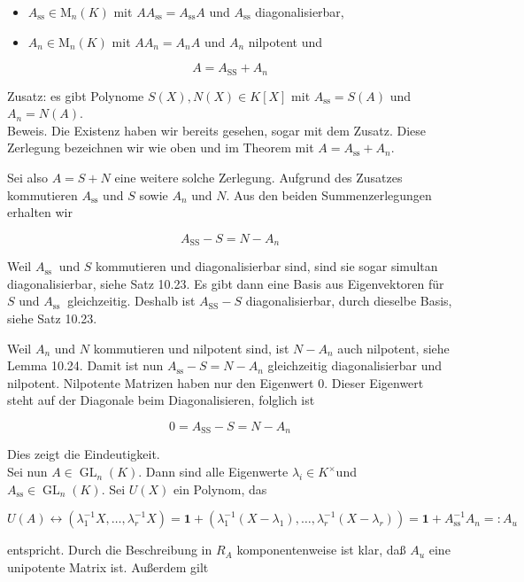 \documentclass[10pt, letterpaper]{article}
\begin{document}
\begin{itemize}
  \item $A_{\mathrm{ss}} \in \mathrm{M}_{n}(K)$ mit $A A_{\mathrm{ss}}=A_{\mathrm{ss}} A$ und $A_{\mathrm{ss}}$ diagonalisierbar,
  \item $A_{n} \in \mathrm{M}_{n}(K)$ mit $A A_{n}=A_{n} A$ und $A_{n}$ nilpotent und
\end{itemize}

$$
A=A_{\mathrm{SS}}+A_{n}
$$

Zusatz: es gibt Polynome $S(X), N(X) \in K[X]$ mit $A_{\mathrm{ss}}=S(A)$ und $A_{n}=N(A)$.\\
Beweis. Die Existenz haben wir bereits gesehen, sogar mit dem Zusatz. Diese Zerlegung bezeichnen wir wie oben und im Theorem mit $A=A_{\mathrm{ss}}+A_{n}$.

Sei also $A=S+N$ eine weitere solche Zerlegung. Aufgrund des Zusatzes kommutieren $A_{\mathrm{ss}}$ und $S$ sowie $A_{n}$ und $N$. Aus den beiden Summenzerlegungen erhalten wir

$$
A_{\mathrm{SS}}-S=N-A_{n}
$$

Weil $A_{\text {ss }}$ und $S$ kommutieren und diagonalisierbar sind, sind sie sogar simultan diagonalisierbar, siehe Satz 10.23. Es gibt dann eine Basis aus Eigenvektoren für $S$ und $A_{\text {ss }}$ gleichzeitig. Deshalb ist $A_{\mathrm{SS}}-S$ diagonalisierbar, durch dieselbe Basis, siehe Satz 10.23.

Weil $A_{n}$ und $N$ kommutieren und nilpotent sind, ist $N-A_{n}$ auch nilpotent, siehe Lemma 10.24. Damit ist nun $A_{\mathrm{ss}}-S=N-A_{n}$ gleichzeitig diagonalisierbar und nilpotent. Nilpotente Matrizen haben nur den Eigenwert 0. Dieser Eigenwert steht auf der Diagonale beim Diagonalisieren, folglich ist

$$
0=A_{\mathrm{SS}}-S=N-A_{n}
$$

Dies zeigt die Eindeutigkeit.\\
Sei nun $A \in \operatorname{GL}_{n}(K)$. Dann sind alle Eigenwerte $\lambda_{i} \in K^{\times}$und $A_{\mathrm{ss}} \in \operatorname{GL}_{n}(K)$. Sei $U(X)$ ein Polynom, das

$$
U(A) \leftrightarrow\left(\lambda_{1}^{-1} X, \ldots, \lambda_{r}^{-1} X\right)=\mathbf{1}+\left(\lambda_{1}^{-1}\left(X-\lambda_{1}\right), \ldots, \lambda_{r}^{-1}\left(X-\lambda_{r}\right)\right)=\mathbf{1}+A_{\mathrm{ss}}^{-1} A_{n}=: A_{u}
$$

entspricht. Durch die Beschreibung in $R_{A}$ komponentenweise ist klar, daß $A_{u}$ eine unipotente Matrix ist. Außerdem gilt
\end{document}
